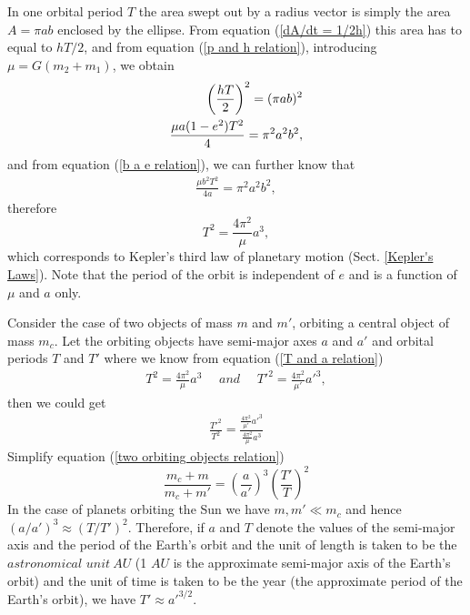 In one orbital period $T$ the area swept out by a radius vector is simply the area $A = \pi ab$ enclosed by the ellipse. From equation (\ref{dA/dt = 1/2h}) this area has to equal to $hT/2$, and from equation (\ref{p and h relation}), introducing $\mu = G(m_2 + m_1)$, we obtain
\begin{align}
    \left( \frac{hT}{2} \right)^2 = (\pi ab)^2 \notag\\
    \frac{\mu a(1-e^2) T^2}{4} = \pi^2 a^2 b^2, \notag\\
\end{align}
and from equation (\ref{b a e relation}), we can further know that
\begin{align}
    \frac{\mu b^2 T^2}{4a} = \pi^2 a^2 b^2,
    \tag{63}
\end{align}
therefore
\begin{equation}
    T^2 = \frac{4 \pi^2}{\mu} a^3,
    \label{T and a relation}
    \tag{64}
\end{equation}
which corresponds to Kepler's third law of planetary motion (Sect. \ref{Kepler's Laws}). Note that the period of the orbit is independent of $e$ and is a function of $\mu$ and $a$ only.

Consider the case of two objects of mass $m$ and $m'$, orbiting a central object of mass $m_c$. Let the orbiting objects have semi-major axes $a$ and $a'$ and orbital periods $T$ and $T'$ where we know  from equation (\ref{T and a relation})
\begin{align}
    T^2 = \frac{4 \pi^2}{\mu} a^3 ~~~~~~and~~~~~~ T'^2 = \frac{4 \pi^2}{\mu'} a'^3,
    \tag{65}
\end{align}
then we could get
\begin{align}
    \frac{T'^2}{T^2} = \frac{\frac{4 \pi^2}{\mu'} a'^3}{\frac{4 \pi^2}{\mu} a^3}
    \tag{66}
    \label{two orbiting objects relation}
\end{align}
Simplify equation (\ref{two orbiting objects relation})
\begin{equation}
    \frac{m_c + m}{m_c + m'} = \left( \frac{a}{a'} \right)^3 \left( \frac{T'}{T} \right)^2
    \tag{67}
\end{equation}
In the case of planets orbiting the Sun we have $m, m' \ll m_c$ and hence $(a/a')^3 \approx (T/T')^2$. Therefore, if $a$ and $T$ denote the values of the semi-major axis and the period of the Earth’s orbit and the unit of length is taken to be the $\textit{astronomical unit} ~AU$ (1 $AU$ is the approximate semi-major axis of the Earth’s orbit) and the unit of time is taken to be the year (the approximate period of the Earth’s orbit), we have $T' \approx a'^{3/2}$.

